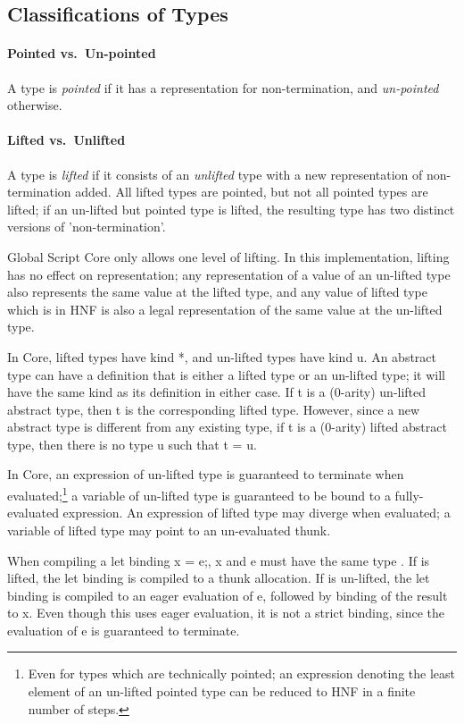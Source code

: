 \documentclass{article}
\newcommand\defn[1]{\emph{#1}}
\newcommand\lift[1]{\left\lfloor#1\right\rfloor}
\begin{document}
\subsection{Classifications of Types}

\paragraph{Pointed vs.~Un-pointed}
A type is \defn{pointed} if it has a representation for non-termination, and \defn{un-pointed} otherwise.

\paragraph{Lifted vs.~Unlifted}
A type is \defn{lifted} if it consists of an \defn{unlifted} type with a new representation of non-termination added.
All lifted types are pointed, but not all pointed types are lifted;
if an un-lifted but pointed type is lifted,
the resulting type has two distinct versions of 'non-termination'.

Global Script Core only allows one level of lifting.
In this implementation, lifting has no effect on representation;
any representation of a value of an un-lifted type also represents the same value at the lifted type,
and any value of lifted type which is in HNF is also a legal representation of the same value at the un-lifted type.

In Core, lifted types have kind \<*\>, and un-lifted types have kind \<u\>.
An abstract type can have a definition that is either a lifted type or an un-lifted type;
it will have the same kind as its definition in either case.
If \<t\> is a (0-arity) un-lifted abstract type, then \<\lift{t}\> is the corresponding lifted type.
However, since a new abstract type is different from any existing type,
if \<t\> is a (0-arity) lifted abstract type, then there is no type \<u\> such that \<t = \lift{u}\>.

In Core, an expression of un-lifted type is guaranteed to terminate when evaluated;\footnote{
    Even for types which are technically pointed;
    an expression denoting the least element of an un-lifted pointed type
    can be reduced to HNF in a finite number of steps.
} a variable of un-lifted type is guaranteed to be bound to a fully-evaluated expression.
An expression of lifted type may diverge when evaluated;
a variable of lifted type may point to an un-evaluated thunk.

When compiling a let binding \<x = e;\>, \<x\> and \<e\> must have the same type \<\tau\>.
If \<\tau\> is lifted, the let binding is compiled to a thunk allocation.
If \<\tau\> is un-lifted, the let binding is compiled to an eager evaluation of \<e\>,
followed by binding of the result to \<x\>.
Even though this uses eager evaluation, it is not a strict binding, since the evaluation of \<e\> is guaranteed to terminate.
\end{document}
